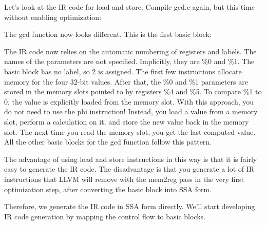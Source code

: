 Let’s look at the IR code for load and store. Compile gcd.c again, but this time without enabling optimization:


The gcd function now looks different. This is the first basic block:

\begin{shell}
define i32 @gcd(i32, i32) {
    store i32 %
    store i32 %
    br i1 %
\end{shell}

The IR code now relies on the automatic numbering of registers and labels. The names of the parameters are not specified. Implicitly, they are \%0 and \%1. The basic block has no label, so 2 is assigned. The first few instructions allocate memory for the four 32-bit values. After that, the \%0 and \%1 parameters are stored in the memory slots pointed to by registers \%4 and \%5. To compare \%1 to 0, the value is explicitly loaded from the memory slot. With this approach, you do not need to use the phi instruction! Instead, you load a value from a memory slot, perform a calculation on it, and store the new value back in the memory slot. The next time you read the memory slot, you get the last computed value. All the other basic blocks for the gcd function follow this pattern.

The advantage of using load and store instructions in this way is that it is fairly easy to generate the IR code. The disadvantage is that you generate a lot of IR instructions that LLVM will remove with the mem2reg pass in the very first optimization step, after converting the basic block into SSA form.

Therefore, we generate the IR code in SSA form directly.
We’ll start developing IR code generation by mapping the control flow to basic blocks.


